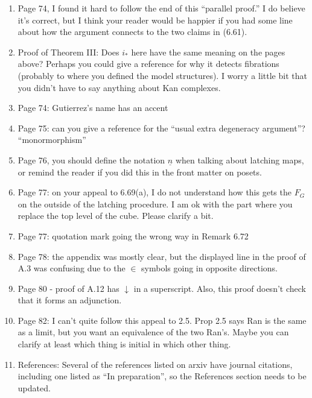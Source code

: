 \documentclass{article}
\begin{document}
\begin{enumerate}
\item
Page 74, I found it hard to follow the end of this ``parallel proof.'' I do believe it's correct, but I think your reader would be happier if you had some line about how the argument connects to the two claims in (6.61).

\item
Proof of Theorem III: Does $i_*$ here have the same meaning on the pages above? Perhaps you could give a reference for why it detects fibrations (probably to where you defined the model structures). I worry a little bit that you didn't have to say anything about Kan complexes.

\item
Page 74: Gutierrez's name has an accent

\item
Page 75: can you give a reference for the ``usual extra degeneracy argument''?
``monormorphism''

\item
Page 76, you should define the notation $\underline{n}$ when talking about latching maps, or remind the reader if you did this in the front matter on posets.

\item
Page 77: on your appeal to 6.69(a), I do not understand how this gets the $F_G$ on the outside of the latching procedure. I am ok with the part where you replace the top level of the cube. Please clarify a bit.

\item
Page 77: quotation mark going the wrong way in Remark 6.72

\item
Page 78: the appendix was mostly clear, but the displayed line in the proof of A.3 was confusing due to the $\in$ symbols going in opposite directions.

\item
Page 80 - proof of A.12 has $\downarrow$ in a superscript. Also, this proof doesn't check that it forms an adjunction.

\item
Page 82: I can't quite follow this appeal to 2.5. Prop 2.5 says Ran is the same as a limit, but you want an equivalence of the two Ran's. Maybe you can clarify at least which thing is initial in which other thing. 

\item
References:
Several of the references listed on arxiv have journal citations, including one listed as ``In preparation'', so the References section needs to be updated.



\end{enumerate}







{}


\end{document}
